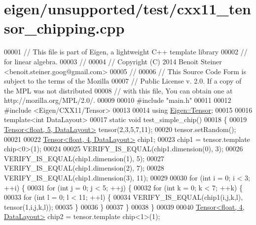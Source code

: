 \hypertarget{eigen_2unsupported_2test_2cxx11__tensor__chipping_8cpp_source}{}\section{eigen/unsupported/test/cxx11\+\_\+tensor\+\_\+chipping.cpp}
\label{eigen_2unsupported_2test_2cxx11__tensor__chipping_8cpp_source}

\begin{DoxyCode}
00001 \textcolor{comment}{// This file is part of Eigen, a lightweight C++ template library}
00002 \textcolor{comment}{// for linear algebra.}
00003 \textcolor{comment}{//}
00004 \textcolor{comment}{// Copyright (C) 2014 Benoit Steiner <benoit.steiner.goog@gmail.com>}
00005 \textcolor{comment}{//}
00006 \textcolor{comment}{// This Source Code Form is subject to the terms of the Mozilla}
00007 \textcolor{comment}{// Public License v. 2.0. If a copy of the MPL was not distributed}
00008 \textcolor{comment}{// with this file, You can obtain one at http://mozilla.org/MPL/2.0/.}
00009 
00010 \textcolor{preprocessor}{#include "main.h"}
00011 
00012 \textcolor{preprocessor}{#include <Eigen/CXX11/Tensor>}
00013 
00014 \textcolor{keyword}{using} \hyperlink{class_eigen_1_1_tensor}{Eigen::Tensor};
00015 
00016 \textcolor{keyword}{template}<\textcolor{keywordtype}{int} DataLayout>
00017 \textcolor{keyword}{static} \textcolor{keywordtype}{void} test\_simple\_chip()
00018 \{
00019   \hyperlink{class_eigen_1_1_tensor}{Tensor<float, 5, DataLayout>} tensor(2,3,5,7,11);
00020   tensor.setRandom();
00021 
00022   \hyperlink{class_eigen_1_1_tensor}{Tensor<float, 4, DataLayout>} chip1;
00023   chip1 = tensor.template chip<0>(1);
00024 
00025   VERIFY\_IS\_EQUAL(chip1.dimension(0), 3);
00026   VERIFY\_IS\_EQUAL(chip1.dimension(1), 5);
00027   VERIFY\_IS\_EQUAL(chip1.dimension(2), 7);
00028   VERIFY\_IS\_EQUAL(chip1.dimension(3), 11);
00029 
00030   \textcolor{keywordflow}{for} (\textcolor{keywordtype}{int} i = 0; i < 3; ++i) \{
00031     \textcolor{keywordflow}{for} (\textcolor{keywordtype}{int} j = 0; j < 5; ++j) \{
00032       \textcolor{keywordflow}{for} (\textcolor{keywordtype}{int} k = 0; k < 7; ++k) \{
00033         \textcolor{keywordflow}{for} (\textcolor{keywordtype}{int} l = 0; l < 11; ++l) \{
00034           VERIFY\_IS\_EQUAL(chip1(i,j,k,l), tensor(1,i,j,k,l));
00035         \}
00036       \}
00037     \}
00038   \}
00039 
00040   \hyperlink{class_eigen_1_1_tensor}{Tensor<float, 4, DataLayout>} chip2 = tensor.template chip<1>(1);

\end{DoxyCode}

